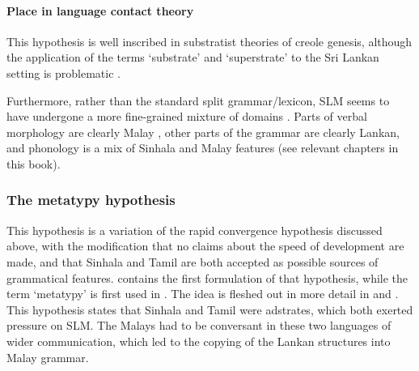\paragraph{Place in language contact theory}
This hypothesis is well inscribed in substratist theories of creole genesis, although the application of the terms `substrate' and `superstrate'  to the Sri Lankan setting is problematic \citep{Ansaldo2008genesis}.

Furthermore, rather than the standard split grammar/lexicon, SLM seems to have undergone a more fine-grained  mixture of domains \citep{Ansaldo2008genesis}. Parts of verbal morphology are clearly Malay \citep{Slomanson2006cll}, other parts of the grammar are clearly Lankan, and phonology is a mix of Sinhala and Malay features (see relevant chapters in this book).

\subsubsection{The metatypy hypothesis}\label{sec:slmbg:metatypy}
This hypothesis is a variation of the rapid convergence hypothesis discussed above, with the modification that no claims about the speed of development are made, and that Sinhala and Tamil are both accepted as possible sources of grammatical features. \citet{Ansaldo2005ms} contains the first formulation of that hypothesis, while the term `metatypy' is first used in \citet{Bakker2006}. The idea is fleshed out in more detail in \citet{Ansaldo2008genesis,Ansaldo2009book} and \citet{AnsaldoEtAlFCLT}. This hypothesis states that Sinhala and Tamil were adstrates, which both exerted pressure on SLM. The Malays had to be conversant in these two languages of wider communication, which led to the copying of the Lankan structures into Malay grammar.

